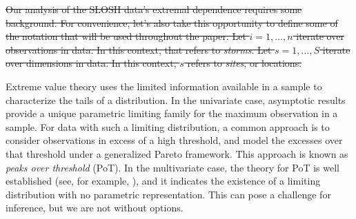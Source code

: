\st{Our analysis of the SLOSH data's extremal dependence requires some background.  
      For 
    convenience, let's also take this opportunity to define some of the notation 
    that will be used throughout the paper.  Let $i = 1,\ldots,n$ iterate over 
    observations in data.  In this context, that refers to \emph{storms}.
    Let $s = 1,\ldots,S$  iterate over dimensions in data.  In this context, 
    $s$ refers to \emph{sites}, or locations.}

Extreme value theory uses the limited information available in a sample to
    characterize the tails of a distribution.  In the univariate case, asymptotic
    results provide a unique parametric limiting family for the maximum observation
    in a sample.  For data with such a limiting distribution, a common approach
    is to consider observations in excess of a high threshold, and model the
    excesses over that threshold under a generalized Pareto framework.  This
    approach is known as \emph{peaks over threshold} (PoT).  In the multivariate 
    case, the theory for PoT is well established (see, for example, 
    \cite{dehaan2006}), and it indicates the existence of a limiting distribution
    with no parametric representation.  This can pose a challenge for inference,
    but we are not without options.

